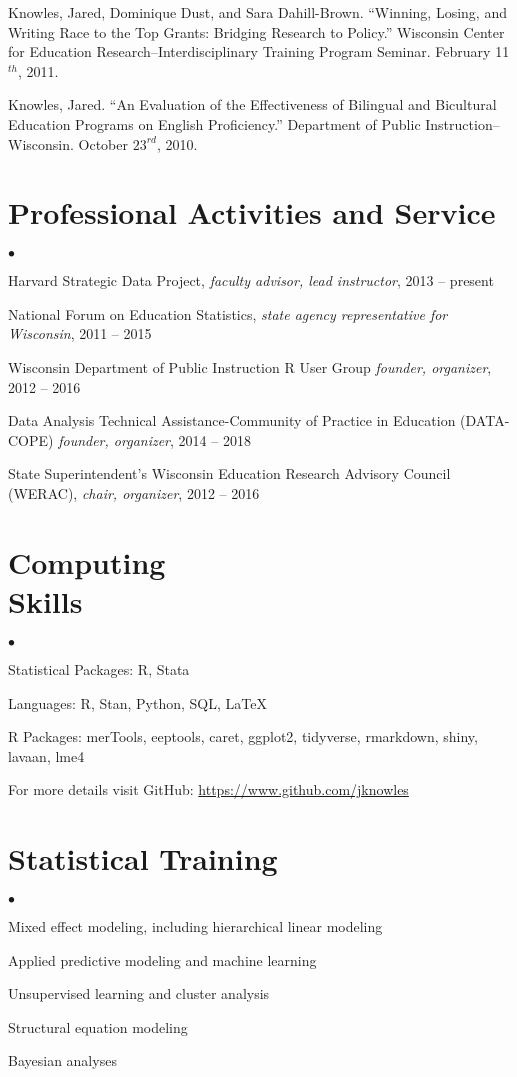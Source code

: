 \documentclass[margin,line]{res}
\newenvironment{list2}{
  \begin{list}{$\bullet$}{%
      \setlength{\itemsep}{0in}
      \setlength{\parsep}{0in} \setlength{\parskip}{0in}
      \setlength{\topsep}{0in} \setlength{\partopsep}{0in} 
      \setlength{\leftmargin}{0.2in}}}{\end{list}}
\begin{document}
\begin{resume}
Knowles, Jared, Dominique Dust, and Sara Dahill-Brown. ``Winning, Losing, and Writing Race to the Top Grants: Bridging Research to Policy.'' Wisconsin Center for Education Research--Interdisciplinary Training Program Seminar. February 11$^{th}$, 2011.

Knowles, Jared. ``An Evaluation of the Effectiveness of Bilingual and Bicultural Education Programs on English Proficiency.'' Department of Public Instruction--Wisconsin. October $23^{rd}$, 2010. 

\section{\sc Professional Activities and Service}

\begin{list2}
\item Harvard Strategic Data Project, \emph{faculty advisor, lead instructor}, 2013 -- present
\item National Forum on Education Statistics, \emph{state agency representative for Wisconsin}, 
2011 -- 2015
\item Wisconsin Department of Public Instruction R User Group \emph{founder, organizer}, 
2012 -- 2016 
\item Data Analysis Technical Assistance-Community of Practice in Education 
(DATA-COPE) \emph{founder, organizer}, 2014 -- 2018
\item State Superintendent's Wisconsin Education Research Advisory Council (WERAC), 
\emph{chair, organizer}, 2012 -- 2016
\end{list2}
 
\section{\sc Computing \\ Skills} 
\begin{list2}
\item Statistical Packages: R, Stata
\item Languages:  R, Stan, Python, SQL, \LaTeX
\item R Packages: merTools, eeptools, caret, 
ggplot2, tidyverse, rmarkdown, shiny, lavaan, lme4
\item For more details visit GitHub: \url{https://www.github.com/jknowles}\\
\end{list2}

\section{\sc Statistical Training}
\begin{list2}
\item Mixed effect modeling, including hierarchical linear modeling
\item Applied predictive modeling and machine learning
\item Unsupervised learning and cluster analysis
\item Structural equation modeling
\item Bayesian analyses
\end{list2}


\end{resume}
\end{document}
